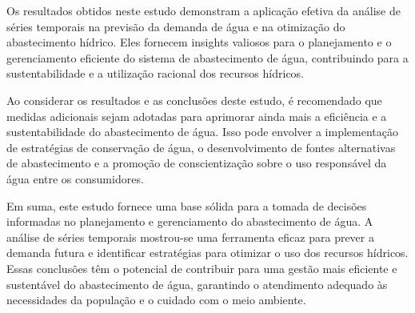 Os resultados obtidos neste estudo demonstram a aplicação efetiva da análise de séries temporais na previsão da demanda de água e na otimização do abastecimento hídrico. Eles fornecem insights valiosos para o planejamento e o gerenciamento eficiente do sistema de abastecimento de água, contribuindo para a sustentabilidade e a utilização racional dos recursos hídricos.

Ao considerar os resultados e as conclusões deste estudo, é recomendado que medidas adicionais sejam adotadas para aprimorar ainda mais a eficiência e a sustentabilidade do abastecimento de água. Isso pode envolver a implementação de estratégias de conservação de água, o desenvolvimento de fontes alternativas de abastecimento e a promoção de conscientização sobre o uso responsável da água entre os consumidores.

Em suma, este estudo fornece uma base sólida para a tomada de decisões informadas no planejamento e gerenciamento do abastecimento de água. A análise de séries temporais mostrou-se uma ferramenta eficaz para prever a demanda futura e identificar estratégias para otimizar o uso dos recursos hídricos. Essas conclusões têm o potencial de contribuir para uma gestão mais eficiente e sustentável do abastecimento de água, garantindo o atendimento adequado às necessidades da população e o cuidado com o meio ambiente.

